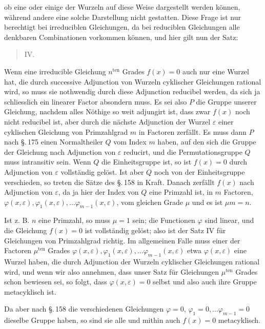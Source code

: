ob eine oder einige der Wurzeln auf diese Weise dargestellt
werden können, während andere eine solche Darstellung nicht
gestatten. Diese Frage ist nur berechtigt bei irreduciblen Gleichungen, da bei reduciblen Gleichungen alle denkbaren Combinationen vorkommen können, und hier gilt nun der Satz:

\begin{quote}
\noindent IV.\ 
\end{quote}

Wenn eine irreducible Gleichung $n^{\text{ten}}$ Grades $f(x) = 0$ auch
nur eine Wurzel hat, die durch successive Adjunction von Wurzeln
cyklischer Gleichungen rational wird, so muss sie nothwendig
durch diese Adjunction reducibel werden, da sich ja schliesslich
ein linearer Factor absondern muss. Es sei also $P$ die Gruppe
unserer Gleichung, nachdem alles Nöthige so weit adjungirt ist,
dass zwar $f(x)$ noch nicht reducibel ist, aber durch die nächste
Adjunction der Wurzel $\varepsilon$ einer cyklischen Gleichung von Primzahlgrad $m$ in Factoren zerfällt. Es muss dann $P$ nach \S.\,175
einen Normaltheiler $Q$ vom Index $m$ haben, auf den sich die
Gruppe der Gleichung nach Adjunction von $\varepsilon$ reducirt, und die
Permutationsgruppe $Q$ muss intransitiv sein. Wenn $Q$ die Einheitsgruppe ist, so ist $f(x) = 0$ durch Adjunction von $\varepsilon$ vollständig gelöst. Ist aber $Q$ noch von der Einheitsgruppe verschieden, so treten die Sätze des \S.\,158 in Kraft. Danach zerfällt
$f(x)$ nach Adjunction von $\varepsilon$, da ja hier der Index von $Q$ eine
Primzahl ist, in $m$ Factoren, $\varphi(x, \varepsilon), \varphi_1(x, \varepsilon), \ldots \varphi_{m-1}(x, \varepsilon)$, vom
gleichen Grade $\mu$ und es ist $\mu m = n$.

Ist z. B. $n$ eine Primzahl, so muss $\mu = 1$ sein; die Functionen $\varphi$ sind linear, und die Gleichung $f(x) = 0$ ist vollständig gelöst; also ist der Satz IV für Gleichungen von Primzahlgrad richtig. Im allgemeinen Falle muss einer der Factoren
$\mu^{\text{ten}}$ Grades $\varphi(x, \varepsilon), \varphi_1(x, \varepsilon), \ldots \varphi_{m-1}(x, \varepsilon)$ etwa $\varphi(x, \varepsilon)$ eine
Wurzel haben, die durch Adjunction der Wurzeln cyklischer
Gleichungen rational wird, und wenn wir also annehmen, dass
unser Satz für Gleichungen $\mu^{\text{ten}}$ Grades schon bewiesen sei, so
folgt, dass $\varphi(x, \varepsilon) = 0$ selbst und also auch ihre Gruppe metacyklisch ist.

Da aber nach \S.\,158 die verschiedenen Gleichungen $\varphi = 0$,
$\varphi_1 = 0, \ldots \varphi_{m-1} = 0$ dieselbe Gruppe haben, so sind sie alle
und mithin auch $f(x) = 0$ metacyklisch.
